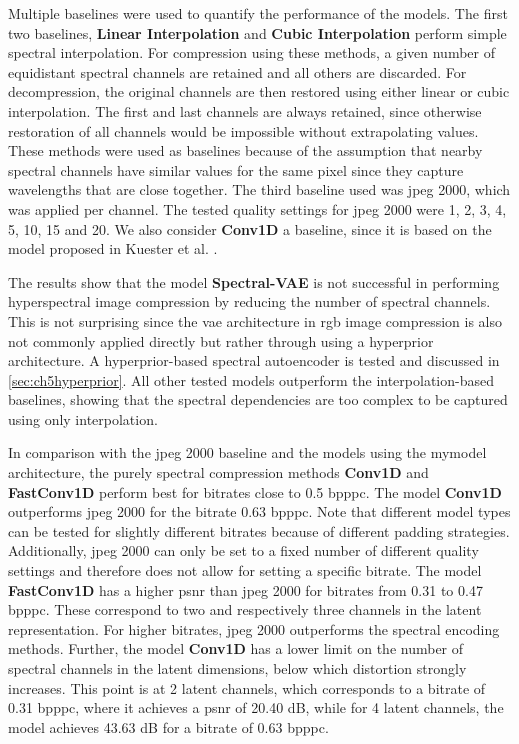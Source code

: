 Multiple baselines were used to quantify the performance of the models. The first two baselines, \textbf{Linear Interpolation} and \textbf{Cubic Interpolation} perform simple spectral interpolation. For compression using these methods, a given number of equidistant spectral channels are retained and all others are discarded. For decompression, the original channels are then restored using either linear or cubic interpolation. The first and last channels are always retained, since otherwise restoration of all channels would be impossible without extrapolating values. These methods were used as baselines because of the assumption that nearby spectral channels have similar values for the same pixel since they capture wavelengths that are close together. The third baseline used was \ac{jpeg} 2000, which was applied per channel. The tested quality settings for \ac{jpeg} 2000 were 1, 2, 3, 4, 5, 10, 15 and 20. We also consider \textbf{Conv1D} a baseline, since it is based on the model proposed in Kuester et al. \citep{kuester_1d-convolutional_2021,kuester_transferability_2022}.

The results show that the model \textbf{Spectral-VAE} is not successful in performing hyperspectral image compression by reducing the number of spectral channels. This is not surprising since the \ac{vae} architecture in \ac{rgb} image compression is also not commonly applied directly but rather through using a hyperprior architecture. A hyperprior-based spectral autoencoder is tested and discussed in \autoref{sec:ch5hyperprior}. All other tested models outperform the interpolation-based baselines, showing that the spectral dependencies are too complex to be captured using only interpolation.

In comparison with the \ac{jpeg} 2000 baseline and the models using the \ac{mymodel} architecture, the purely spectral compression methods \textbf{Conv1D} and \textbf{FastConv1D} perform best for bitrates close to 0.5 \ac{bpppc}. The model \textbf{Conv1D} outperforms \ac{jpeg} 2000 for the bitrate 0.63 \ac{bpppc}. Note that different model types can be tested for slightly different bitrates because of different padding strategies. Additionally, \ac{jpeg} 2000 can only be set to a fixed number of different quality settings and therefore does not allow for setting a specific bitrate. The model \textbf{FastConv1D} has a higher \ac{psnr} than \ac{jpeg} 2000 for bitrates from 0.31 to 0.47 \ac{bpppc}. These correspond to two and respectively three channels in the latent representation. For higher bitrates, \ac{jpeg} 2000 outperforms the spectral encoding methods. Further, the model \textbf{Conv1D} has a lower limit on the number of spectral channels in the latent dimensions, below which distortion strongly increases. This point is at 2 latent channels, which corresponds to a bitrate of 0.31 \ac{bpppc}, where it achieves a \ac{psnr} of 20.40 dB, while for 4 latent channels, the model achieves 43.63 dB for a bitrate of 0.63 \ac{bpppc}.

